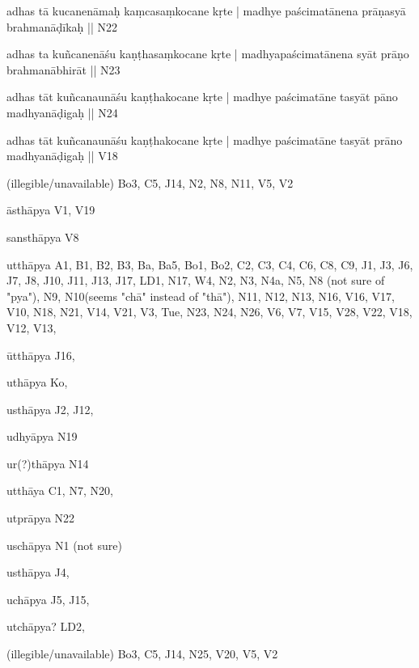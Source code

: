 \begin{ekdosis}
\begin{marma}[hp01_055]
\begin{marma}[hp02_009]
\begin{marma}[hp02_011]
\begin{marma}[hp02_46]
\item[adhas tā kucanenāmaḥ kaṃcasaṃkocane kṛte | madhye paścimatānena prāṇasyā brahmanāḍīkaḥ ||] N22
\item[adhas ta kuñcanenāśu kaṇṭhasaṃkocane kṛte | madhyapaścimatānena syāt prāṇo brahmanābhirāt ||] N23
\item[adhas tāt kuñcanaunāśu kaṇṭhakocane kṛte | madhye paścimatāne tasyāt pāno madhyanāḍigaḥ ||] N24
\item[adhas tāt kuñcanaunāśu kaṇṭhakocane kṛte | madhye paścimatāne tasyāt prāno madhyanāḍigaḥ ||] V18
\item[(illegible/unavailable)] Bo3, C5, J14, N2, N8, N11, V5, V2
 \begin{description}

        \end{description}
\end{marma}

\begin{marma}[hp02_48b]
\item[āsthāpya] V1, V19
\item[sansthāpya] V8
\item[utthāpya] A1, B1, B2, B3, Ba, Ba5, Bo1, Bo2, C2, C3, C4, C6, C8, C9, J1, J3, J6, J7, J8, J10, J11, J13, J17, LD1, N17, W4, N2, N3, N4a, N5, N8 (not sure of "pya"), N9, N10(seems "chā" instead of "thā"), N11, N12, N13, N16, V16, V17, V10, N18, N21, V14, V21, V3, Tue, N23, N24, N26, V6, V7, V15, V28, V22, V18, V12, V13,
\item[ūtthāpya] J16,
\item[uthāpya] Ko,
\item[usthāpya] J2, J12, 
\item[udhyāpya] N19
\item[ur(?)thāpya] N14
\item[utthāya] C1, N7, N20,
\item[utprāpya] N22
\item[uschāpya] N1 (not sure)
\item[usthāpya] J4,
\item[uchāpya] J5, J15, 
\item[utchāpya?] LD2,
\item[(illegible/unavailable)] Bo3, C5, J14, N25, V20, V5, V2

 \begin{description}

        \end{description}
\end{marma}


\end{marma}
\end{marma}
\end{marma}
\end{ekdosis}
